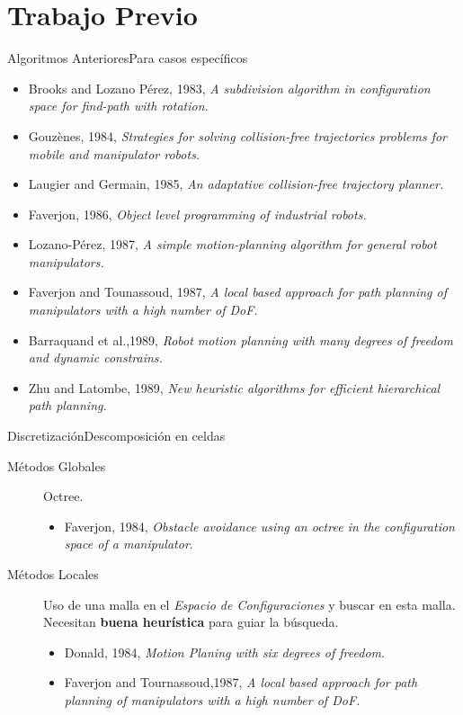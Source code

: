 \documentclass{beamer}
\begin{document}
\section{Trabajo Previo}

\begin{frame}{Algoritmos Anteriores}{Para casos específicos}
	\begin{itemize}
		\item Brooks and Lozano Pérez, 1983, \textit{A subdivision algorithm in configuration space for find-path with rotation.}
		\item Gouzènes, 1984, \textit{Strategies for solving collision-free trajectories problems for mobile and manipulator robots.}
		\item Laugier and Germain, 1985, \textit{An adaptative collision-free trajectory planner.}
		\item Faverjon, 1986, \textit{Object level programming of industrial robots.}
		\item Lozano-Pérez, 1987, \textit{A simple motion-planning algorithm for general robot manipulators.}
		\item Faverjon and Tounassoud, 1987, \textit{A local based approach for path planning of manipulators with a high number of DoF.}
		\item  Barraquand et al.,1989, \textit{Robot motion planning with many degrees of freedom and dynamic constrains.}
		\item Zhu and Latombe, 1989, \textit{New heuristic algorithms for efficient hierarchical path planning.}
	\end{itemize}
\end{frame}

\begin{frame}{Discretización}{Descomposición en celdas}
\begin{description}
\item[Métodos Globales] Octree.
	\begin{itemize}
	\item Faverjon, 1984, \textit{Obstacle avoidance using an octree in the configuration space of a manipulator}.
	\end{itemize}
\item[Métodos Locales] Uso de una malla en el \textit{Espacio de Configuraciones} y buscar en esta malla. Necesitan \textbf{buena heurística} para guiar la búsqueda.
	\begin{itemize}
		\item Donald, 1984, \textit{Motion Planing with six degrees of freedom}.
		\item Faverjon and Tournassoud,1987, \textit{A local based approach for path planning of manipulators with a high number of DoF.} 
	\end{itemize}
\end{description}
\end{frame}
\end{document}
